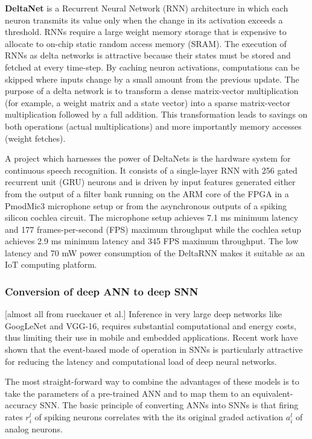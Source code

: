 \documentclass[main]{subfiles}
\begin{document}
\textbf{DeltaNet} is a Recurrent Neural Network (RNN) architecture in which each neuron transmits its value only when the change in its activation exceeds a threshold. RNNs require a large weight memory storage that is expensive to allocate to on-chip static random access memory (SRAM). The execution of RNNs as delta networks is attractive because their states must be stored and fetched at every time-step. By caching neuron activations, computations can be skipped where inputs change by a small amount from the previous update. The purpose of a delta network is to transform a dense matrix-vector multiplication (for example, a weight matrix and a state vector) into a sparse matrix-vector multiplication followed by a full addition. This transformation leads to savings on both operations (actual multiplications) and more importantly memory accesses (weight fetches).

A project which harnesses the power of DeltaNets is the hardware system for continuous speech recognition. It consists of a single-layer RNN with 256 gated recurrent unit (GRU) neurons and is driven by input features generated either from the output of a filter bank running on the ARM core of the FPGA in a PmodMic3 microphone setup or from the asynchronous outputs of a spiking silicon cochlea circuit. The microphone setup achieves 7.1 ms minimum latency and 177 frames-per-second (FPS) maximum throughput while the cochlea setup achieves 2.9 ms minimum latency and 345 FPS maximum throughput. The low latency and 70 mW power consumption of the DeltaRNN makes it suitable as an IoT computing platform.

\subsubsection{Conversion of deep ANN to deep SNN} [almost all from rueckauer et al.]
Inference in very large deep networks like GoogLeNet and VGG-16, requires substantial computational and energy costs, thus limiting their use in mobile and embedded applications. Recent work have shown that the event-based mode of operation in SNNs is particularly attractive for reducing the latency and computational load of deep neural networks. 

The most straight-forward way to combine the advantages of these models is to take the parameters of a pre-trained ANN and to map them to an equivalent-accuracy SNN. The basic principle of converting ANNs into SNNs is that firing rates $r_i^l$ of spiking neurons correlates with the its original graded activation $a_i^l$ of analog neurons. 
\end{document}
